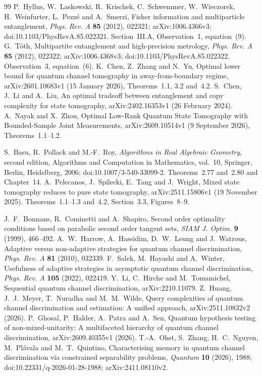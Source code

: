 \begin{thebibliography}{99}
 P.~Hyllus, W.~Laskowski, R.~Krischek,
C.~Schwemmer, W.~Wieczorek, H.~Weinfurter, L.~Pezz\'e and A.~Smerzi,
Fisher information and multiparticle entanglement,
\emph{Phys. Rev. A} \textbf{85} (2012), 022321;
arXiv:1006.4366v3; doi:10.1103/PhysRevA.85.022321.
Section~III.A, Observation~1, equation~(9).
 G.~T\'oth,
Multipartite entanglement and high-precision metrology,
\emph{Phys. Rev. A} \textbf{85} (2012), 022322;
arXiv:1006.4368v3; doi:10.1103/PhysRevA.85.022322.
Observation~3, equation~(6).
 K.~Chen, Z.~Zhang and N.~Yu,
Optimal lower bound for quantum channel tomography in away-from-boundary regime,
arXiv:2601.10683v1 (15 January 2026), Theorems~1.1, 3.2 and~4.2.
 S.~Chen, J.~Li and A.~Liu,
An optimal tradeoff between entanglement and copy complexity for state tomography,
arXiv:2402.16353v1 (26 February 2024).
 A.~Nayak and X.~Zhou,
Optimal Low-Rank Quantum State Tomography with Bounded-Sample Joint Measurements,
arXiv:2609.10514v1 (9 September 2026), Theorems~1.1--1.2.

 S.~Basu, R.~Pollack and M.-F.~Roy,
\emph{Algorithms in Real Algebraic Geometry}, second edition,
Algorithms and Computation in Mathematics, vol.~10,
Springer, Berlin, Heidelberg, 2006;
doi:10.1007/3-540-33099-2.
Theorems~2.77 and~2.80 and Chapter~14.
 A.~Pelecanos, J.~Spilecki, E.~Tang and J.~Wright,
Mixed state tomography reduces to pure state tomography,
arXiv:2511.15806v1 (19 November 2025).
Theorems~1.1--1.3 and~4.2, Section~3.3, Figures~8--9.


 J.~F.~Bonnans, R.~Cominetti and A.~Shapiro,
Second order optimality conditions based on parabolic second order
tangent sets, \emph{SIAM J. Optim.} \textbf{9} (1999), 466--492.
 A.~W.~Harrow, A.~Hassidim, D.~W.~Leung and J.~Watrous,
Adaptive versus non-adaptive strategies for quantum channel
discrimination, \emph{Phys. Rev. A} \textbf{81} (2010), 032339.
 F.~Salek, M.~Hayashi and A.~Winter,
Usefulness of adaptive strategies in asymptotic quantum channel
discrimination, \emph{Phys. Rev. A} \textbf{105} (2022), 022419.
 Y.~Li, C.~Hirche and M.~Tomamichel,
Sequential quantum channel discrimination, arXiv:2210.11079.
 Z.~Huang, J.~J.~Meyer, T.~Nuradha and M.~M.~Wilde,
Query complexities of quantum channel discrimination and estimation:
A unified approach, arXiv:2511.10832v2 (2026).
 P.~Ghosal, P.~Halder, A.~Patra and A.~Sen,
Quantum hypothesis testing of non-mixed-unitarity: A multifaceted
hierarchy of quantum channel discrimination, arXiv:2609.40355v1 (2026).
 T.-A.~Ohst, S.~Zhang, H.~C.~Nguyen,
M.~Pl\'avala and M.~T.~Quintino,
Characterising memory in quantum channel discrimination via
constrained separability problems,
\emph{Quantum} \textbf{10} (2026), 1988;
doi:10.22331/q-2026-01-28-1988; arXiv:2411.08110v2.
\end{thebibliography}
